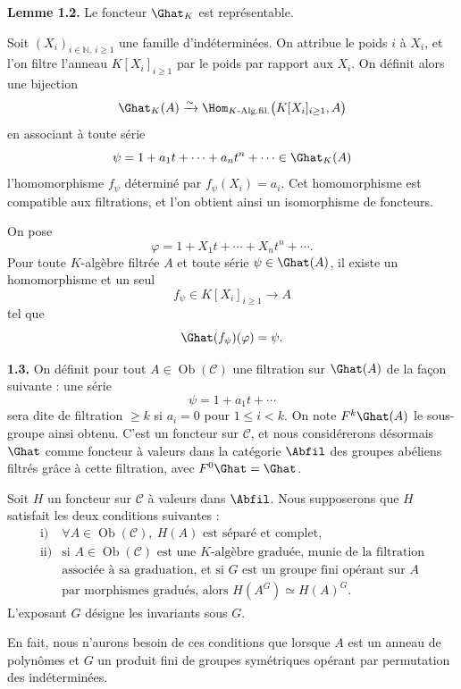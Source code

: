 \documentclass[11pt]{article}
\begin{document}
\textbf{Lemme 1.2.} Le foncteur \(\Ghat_K\) est représentable.

Soit \((X_i)_{i\in\mathbb N,\ i\geq 1}\) une famille d'indéterminées. On attribue le poids \(i\) à \(X_i\), et l'on filtre l'anneau \(K[X_i]_{i\geq 1}\) par le poids par rapport aux \(X_i\). On définit alors une bijection
\[
  \Ghat_K(A)\xrightarrow{\sim}
  \Hom_{K\text{-Alg.fil.}}\bigl(K[X_i]_{i\geq 1},A\bigr)
\]
en associant à toute série
\[
  \psi=1+a_1t+\cdots+a_nt^n+\cdots\in\Ghat_K(A)
\]
l'homomorphisme \(f_\psi\) déterminé par \(f_\psi(X_i)=a_i\). Cet homomorphisme est compatible aux filtrations, et l'on obtient ainsi un isomorphisme de foncteurs.

On pose
\[
  \varphi=1+X_1t+\cdots+X_nt^n+\cdots.
\]
Pour toute \(K\)-algèbre filtrée \(A\) et toute série \(\psi\in\Ghat(A)\), il existe un homomorphisme et un seul
\[
  f_\psi\in K[X_i]_{i\geq 1}\longrightarrow A
\]
tel que
\[
  \Ghat(f_\psi)(\varphi)=\psi .
\]

\textbf{1.3.} On définit pour tout \(A\in\operatorname{Ob}(\mathcal C)\) une filtration sur \(\Ghat(A)\) de la façon suivante : une série
\[
  \psi=1+a_1t+\cdots
\]
sera dite de filtration \(\geq k\) si \(a_i=0\) pour \(1\leq i<k\). On note \(F^k\Ghat(A)\) le sous-groupe ainsi obtenu. C'est un foncteur sur \(\mathcal C\), et nous considérerons désormais \(\Ghat\) comme foncteur à valeurs dans la catégorie \(\Abfil\) des groupes abéliens filtrés grâce à cette filtration, avec \(F^0\Ghat=\Ghat\).

Soit \(H\) un foncteur sur \(\mathcal C\) à valeurs dans \(\Abfil\). Nous supposerons que \(H\) satisfait les deux conditions suivantes :
\[
\begin{array}{ll}
\text{i)} & \forall A\in\operatorname{Ob}(\mathcal C),\ H(A)\text{ est séparé et complet},\\[0.3em]
\text{ii)} & \text{si }A\in\operatorname{Ob}(\mathcal C)\text{ est une }K\text{-algèbre graduée, munie de la filtration}\\
& \text{associée à sa graduation, et si }G\text{ est un groupe fini opérant sur }A\\
& \text{par morphismes gradués, alors }H(A^G)\simeq H(A)^G .
\end{array}
\]
L'exposant \(G\) désigne les invariants sous \(G\).

En fait, nous n'aurons besoin de ces conditions que lorsque \(A\) est un anneau de polynômes et \(G\) un produit fini de groupes symétriques opérant par permutation des indéterminées.
\end{document}
